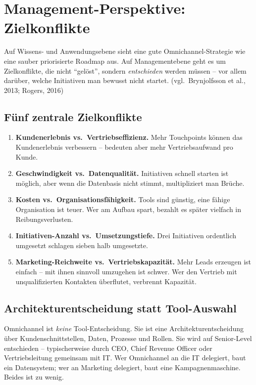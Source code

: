 \documentclass[11pt,a4paper,oneside]{article}
\newcommand{\quelle}[1]{{\footnotesize\color{lpGray}(#1)}}
\begin{document}
\section{Management-Perspektive: Zielkonflikte}

Auf Wissens- und Anwendungsebene sieht eine gute Omnichannel-Strategie wie eine sauber priorisierte Roadmap aus. Auf Managementebene geht es um Zielkonflikte, die nicht ``gelöst'', sondern \emph{entschieden} werden müssen -- vor allem darüber, welche Initiativen man bewusst nicht startet. \quelle{vgl.\ Brynjolfsson et al., 2013; Rogers, 2016}

\subsection{Fünf zentrale Zielkonflikte}

\begin{enumerate}
  \item \textbf{Kundenerlebnis vs.\ Vertriebseffizienz.} Mehr Touchpoints können das Kundenerlebnis verbessern -- bedeuten aber mehr Vertriebsaufwand pro Kunde.
  \item \textbf{Geschwindigkeit vs.\ Datenqualität.} Initiativen schnell starten ist möglich, aber wenn die Datenbasis nicht stimmt, multipliziert man Brüche.
  \item \textbf{Kosten vs.\ Organisationsfähigkeit.} Tools sind günstig, eine fähige Organisation ist teuer. Wer am Aufbau spart, bezahlt es später vielfach in Reibungsverlusten.
  \item \textbf{Initiativen-Anzahl vs.\ Umsetzungstiefe.} Drei Initiativen ordentlich umgesetzt schlagen sieben halb umgesetzte.
  \item \textbf{Marketing-Reichweite vs.\ Vertriebskapazität.} Mehr Leads erzeugen ist einfach -- mit ihnen sinnvoll umzugehen ist schwer. Wer den Vertrieb mit unqualifizierten Kontakten überflutet, verbrennt Kapazität.
\end{enumerate}

\subsection{Architekturentscheidung statt Tool-Auswahl}

Omnichannel ist \emph{keine} Tool-Entscheidung. Sie ist eine Architekturentscheidung über Kundenschnittstellen, Daten, Prozesse und Rollen. Sie wird auf Senior-Level entschieden -- typischerweise durch CEO, Chief Revenue Officer oder Vertriebsleitung gemeinsam mit IT. Wer Omnichannel an die IT delegiert, baut ein Datensystem; wer an Marketing delegiert, baut eine Kampagnenmaschine. Beides ist zu wenig.
\end{document}

